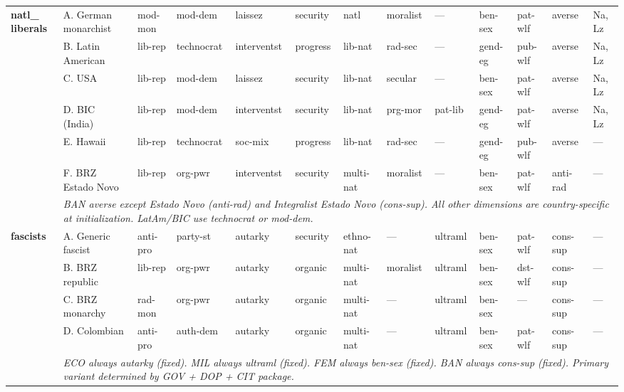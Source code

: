 \documentclass[a4paper]{article}
\newcommand{\nd}{---}
\newcommand{\minorrow}[2]{\rowcolor{minorRow} #1 & \multicolumn{12}{p{22cm}|}{\textit{#2}} \\}
\begin{document}
\begin{footnotesize}
\begin{longtable}{|p{1.8cm}|p{2.3cm}|p{1.55cm}|p{1.65cm}|p{1.65cm}|p{1.3cm}|p{1.5cm}|p{1.5cm}|p{1.5cm}|p{1.3cm}|p{1.45cm}|p{1.0cm}|p{2.65cm}|}
\multirow{7}{*}{\cellcolor{rightHdr}\textbf{natl\_ liberals}} &
  A. German monarchist & mod-mon & mod-dem & laissez & security & natl & moralist & \nd & ben-sex & pat-wlf & averse & Na, Lz \\ \cline{2-13}
\cellcolor{rightHdr} &
  B. Latin American & lib-rep & technocrat & interventst & progress & lib-nat & rad-sec & \nd & gend-eg & pub-wlf & averse & Na, Lz \\ \cline{2-13}
\cellcolor{rightHdr} &
  C. USA & lib-rep & mod-dem & laissez & security & lib-nat & secular & \nd & ben-sex & pat-wlf & averse & Na, Lz \\ \cline{2-13}
\cellcolor{rightHdr} &
  D. BIC (India) & lib-rep & mod-dem & interventst & security & lib-nat & prg-mor & pat-lib & gend-eg & pat-wlf & averse & Na, Lz \\ \cline{2-13}
\cellcolor{rightHdr} &
  E. Hawaii & lib-rep & technocrat & soc-mix & progress & lib-nat & rad-sec & \nd & gend-eg & pub-wlf & averse & \nd \\ \cline{2-13}
\cellcolor{rightHdr} &
  F. BRZ Estado Novo & lib-rep & org-pwr & interventst & security & multi-nat & moralist & \nd & ben-sex & pat-wlf & anti-rad & \nd \\ \cline{2-13}
\minorrow{\cellcolor{rightHdr}}{BAN averse except Estado Novo (anti-rad) and Integralist Estado Novo (cons-sup). All other dimensions are country-specific at initialization. LatAm/BIC use technocrat or mod-dem.}
\hline

\multirow{5}{*}{\cellcolor{rightHdr}\textbf{fascists}} &
  A. Generic fascist & anti-pro & party-st & autarky & security & ethno-nat & \nd & ultraml & ben-sex & pat-wlf & cons-sup & \nd \\ \cline{2-13}
\cellcolor{rightHdr} &
  B. BRZ republic & lib-rep & org-pwr & autarky & organic & multi-nat & moralist & ultraml & ben-sex & dst-wlf & cons-sup & \nd \\ \cline{2-13}
\cellcolor{rightHdr} &
  C. BRZ monarchy & rad-mon & org-pwr & autarky & organic & multi-nat & \nd & ultraml & ben-sex & \nd & cons-sup & \nd \\ \cline{2-13}
\cellcolor{rightHdr} &
  D. Colombian & anti-pro & auth-dem & autarky & organic & multi-nat & \nd & ultraml & ben-sex & pat-wlf & cons-sup & \nd \\ \cline{2-13}
\minorrow{\cellcolor{rightHdr}}{ECO always autarky (fixed). MIL always ultraml (fixed). FEM always ben-sex (fixed). BAN always cons-sup (fixed). Primary variant determined by GOV + DOP + CIT package.}
\hline


\end{longtable}
\end{footnotesize}
\end{document}
